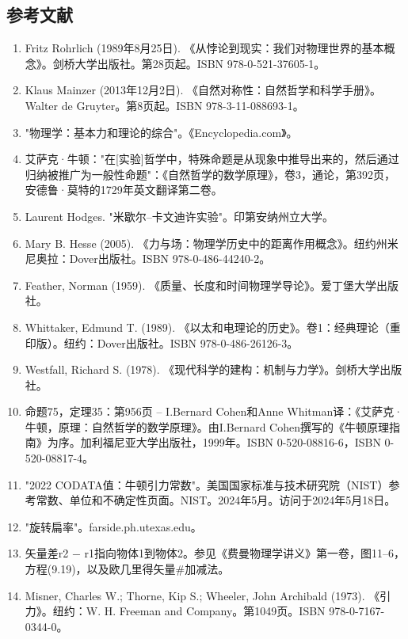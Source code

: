 \subsection{参考文献}
\begin{enumerate}
\item Fritz Rohrlich (1989年8月25日). 《从悖论到现实：我们对物理世界的基本概念》。剑桥大学出版社。第28页起。ISBN 978-0-521-37605-1。
\item Klaus Mainzer (2013年12月2日). 《自然对称性：自然哲学和科学手册》。Walter de Gruyter。第8页起。ISBN 978-3-11-088693-1。
\item "物理学：基本力和理论的综合"。《Encyclopedia.com》。
\item 艾萨克·牛顿："在[实验]哲学中，特殊命题是从现象中推导出来的，然后通过归纳被推广为一般性命题"：《自然哲学的数学原理》，卷3，通论，第392页，安德鲁·莫特的1729年英文翻译第二卷。
\item Laurent Hodges. "米歇尔–卡文迪许实验"。印第安纳州立大学。
\item Mary B. Hesse (2005). 《力与场：物理学历史中的距离作用概念》。纽约州米尼奥拉：Dover出版社。ISBN 978-0-486-44240-2。
\item Feather, Norman (1959). 《质量、长度和时间物理学导论》。爱丁堡大学出版社。
\item Whittaker, Edmund T. (1989). 《以太和电理论的历史》。卷1：经典理论（重印版）。纽约：Dover出版社。ISBN 978-0-486-26126-3。
\item Westfall, Richard S. (1978). 《现代科学的建构：机制与力学》。剑桥大学出版社。
\item 命题75，定理35：第956页 – I.Bernard Cohen和Anne Whitman译：《艾萨克·牛顿，原理：自然哲学的数学原理》。由I.Bernard Cohen撰写的《牛顿原理指南》为序。加利福尼亚大学出版社，1999年。ISBN 0-520-08816-6，ISBN 0-520-08817-4。
\item "2022 CODATA值：牛顿引力常数"。美国国家标准与技术研究院（NIST）参考常数、单位和不确定性页面。NIST。2024年5月。访问于2024年5月18日。
\item "旋转扁率"。farside.ph.utexas.edu。
\item 矢量差r2 − r1指向物体1到物体2。参见《费曼物理学讲义》第一卷，图11–6，方程(9.19)，以及欧几里得矢量#加减法。
\item Misner, Charles W.; Thorne, Kip S.; Wheeler, John Archibald (1973). 《引力》。纽约：W. H. Freeman and Company。第1049页。ISBN 978-0-7167-0344-0。
\end{enumerate}